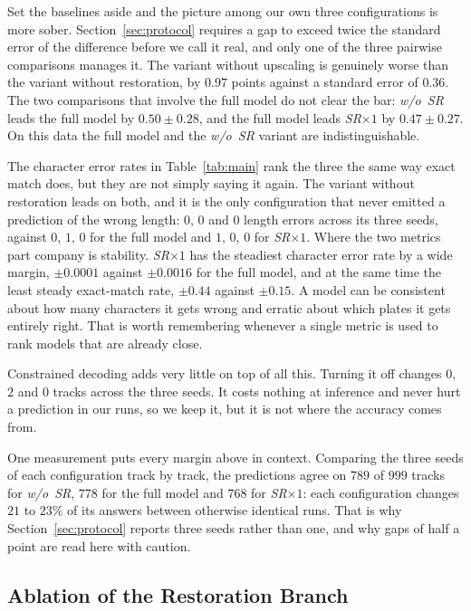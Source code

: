 \documentclass[runningheads]{llncs}
\begin{document}
Set the baselines aside and the picture among our own three configurations is more sober. Section~\ref{sec:protocol} requires a gap to exceed twice the standard error of the difference before we call it real, and only one of the three pairwise comparisons manages it. The variant without upscaling is genuinely worse than the variant without restoration, by $0.97$ points against a standard error of $0.36$. The two comparisons that involve the full model do not clear the bar: \emph{w/o~SR} leads the full model by $0.50 \pm 0.28$, and the full model leads \emph{SR$\times 1$} by $0.47 \pm 0.27$. On this data the full model and the \emph{w/o~SR} variant are indistinguishable.

The character error rates in Table~\ref{tab:main} rank the three the same way exact match does, but they are not simply saying it again. The variant without restoration leads on both, and it is the only configuration that never emitted a prediction of the wrong length: $0$, $0$ and $0$ length errors across its three seeds, against $0$, $1$, $0$ for the full model and $1$, $0$, $0$ for \emph{SR$\times 1$}. Where the two metrics part company is stability. \emph{SR$\times 1$} has the steadiest character error rate by a wide margin, $\pm 0.0001$ against $\pm 0.0016$ for the full model, and at the same time the least steady exact-match rate, $\pm 0.44$ against $\pm 0.15$. A model can be consistent about how many characters it gets wrong and erratic about which plates it gets entirely right. That is worth remembering whenever a single metric is used to rank models that are already close.

Constrained decoding adds very little on top of all this. Turning it off changes $0$, $2$ and $0$ tracks across the three seeds. It costs nothing at inference and never hurt a prediction in our runs, so we keep it, but it is not where the accuracy comes from.

One measurement puts every margin above in context. Comparing the three seeds of each configuration track by track, the predictions agree on $789$ of $999$ tracks for \emph{w/o~SR}, $778$ for the full model and $768$ for \emph{SR$\times 1$}: each configuration changes $21$ to $23\%$ of its answers between otherwise identical runs. That is why Section~\ref{sec:protocol} reports three seeds rather than one, and why gaps of half a point are read here with caution.


\subsection{Ablation of the Restoration Branch}
\end{document}
